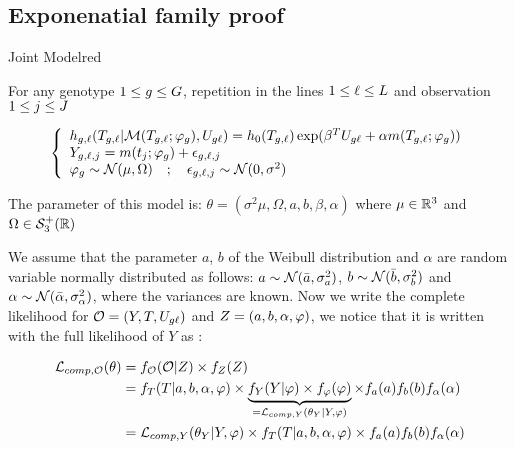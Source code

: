 \documentclass[a4paper]{article}
\begin{document}
    \begin{myAppendix}
    
\subsection{Exponenatial family proof}

\begin{myBoxedEnv}{Joint Model}{\bccrayon}{red}
    
    For any genotype $\foranygeno$,  repetition in the lines  $\foranylines$ and observation $\foranyobs$
    
    \begin{equation}\label{jointmodel}
        \stackeq[lll]{ 
            \hazard_\genolines (T_\genolines|\mc M(T_\genolines;\vphi_\geno), U_\meltgenolines) 
                = \hazard_0(T_\genolines) \exp(\beta ^T U_\meltgenolines + \alpha \nonlinearfct(T_\genolines;\vphi_\geno) )
        \\  Y_\genolinesobs = \nonlinearfct(t_\obs ; \vphi_\geno )  + \epsilon_\genolinesobs 
        \\  \vphi_\geno \sim \mc N(\mu, \Omega) \quad  ;  \quad  \epsilon_\genolinesobs \sim \mc N(0,\sigma^2) }
    \end{equation}
    
    The parameter of this model is: $\theta = (\sigma^2\mu, \Omega, a,b, \beta, \alpha)$ where $\mu\in\setr^3$ and $\Omega\in\mc S^+_3(\setr)$
\end{myBoxedEnv}

We assume that the parameter $a$, $b$ of the Weibull distribution and $\alpha$ are random variable normally distributed as follows: $a\sim\mc N(\bar a,\sigma_a^2)$, $b\sim \mc N(\bar b, \sigma_b^2)$ and $ \alpha\sim \mc N(\bar \alpha, \sigma_ \alpha^2)$, where the variances are known. Now we write the complete likelihood for $\varobs = (Y,T, U_\meltgenolines)$ and $\varlat = (a,b,\alpha,\vphi)$, we notice that it is written with the full likelihood of $Y$ as :

\newcommand{\df}[1]{f_{#1}(#1)}

\begin{align*}
    \Lcomp[,\varobs] ( \theta ) &= f_\varobs(\varobs | \varlat) \times f_{\varlat}(\varlat)
    \\ &= f_T(T | a,b,\alpha,\vphi) \times \ub{f_Y(Y| \vphi) \times  f_\vphi(\vphi)}_{=\Lcomp[,Y](\theta_Y | Y, \vphi)} 
    \times \df a \df b \df \alpha
    \\ &= \Lcomp[,Y](\theta_Y | Y,\vphi) \times f_T(T | a,b,\alpha,\vphi) 
    \times \df a \df b \df \alpha
\end{align*}


\end{myAppendix}
\end{document}
